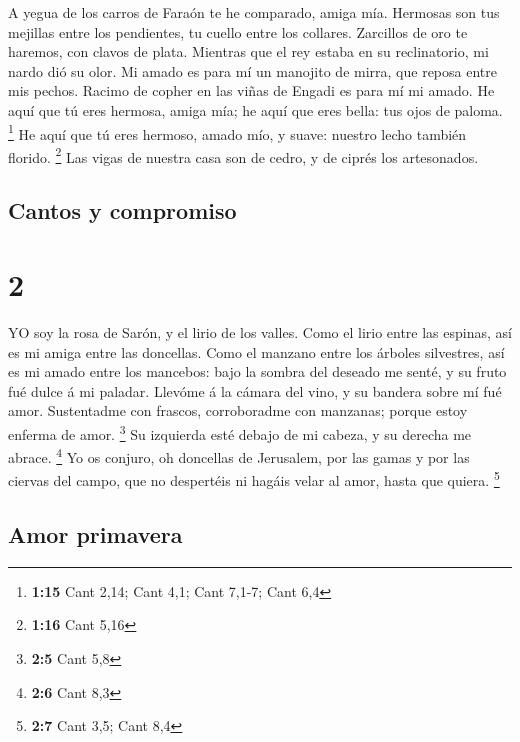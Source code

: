  A yegua de los carros de Faraón te he comparado, amiga mía.
 Hermosas son tus mejillas entre los pendientes, tu cuello
entre los collares.  Zarcillos de oro te haremos, con
clavos de plata.  Mientras que el rey estaba en su
reclinatorio, mi nardo dió su olor.  Mi amado es para mí un
manojito de mirra, que reposa entre mis pechos.  Racimo de
copher en las viñas de Engadi es para mí mi amado.  He aquí
que tú eres hermosa, amiga mía; he aquí que eres bella: tus ojos de
paloma. \footnote{\textbf{1:15} Cant 2,14; Cant 4,1; Cant 7,1-7; Cant
  6,4}  He aquí que tú eres hermoso, amado mío, y suave:
nuestro lecho también florido. \footnote{\textbf{1:16} Cant 5,16}
 Las vigas de nuestra casa son de cedro, y de ciprés los
artesonados.

\hypertarget{cantos-y-compromiso}{%
\subsection{Cantos y compromiso}\label{cantos-y-compromiso}}

\hypertarget{section-1}{%
\section{2}\label{section-1}}

 YO soy la rosa de Sarón, y el lirio de los valles.
 Como el lirio entre las espinas, así es mi amiga entre las
doncellas.  Como el manzano entre los árboles silvestres,
así es mi amado entre los mancebos: bajo la sombra del deseado me senté,
y su fruto fué dulce á mi paladar.  Llevóme á la cámara del
vino, y su bandera sobre mí fué amor.  Sustentadme con
frascos, corroboradme con manzanas; porque estoy enferma de amor.
\footnote{\textbf{2:5} Cant 5,8}  Su izquierda esté debajo
de mi cabeza, y su derecha me abrace. \footnote{\textbf{2:6} Cant 8,3}
 Yo os conjuro, oh doncellas de Jerusalem, por las gamas y
por las ciervas del campo, que no despertéis ni hagáis velar al amor,
hasta que quiera. \footnote{\textbf{2:7} Cant 3,5; Cant 8,4}

\hypertarget{amor-primavera}{%
\subsection{Amor primavera}\label{amor-primavera}}

